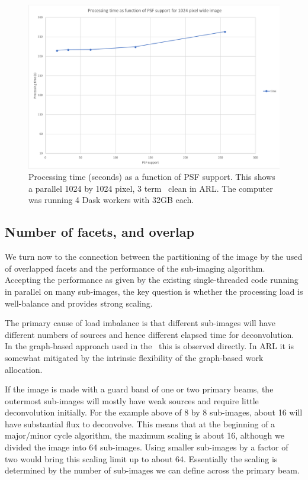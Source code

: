 \documentclass[11pt,a4paper,variablewidth]{article}
\begin{document}
\begin{figure}[h]
  \centering
  \includegraphics[width=\textwidth]{./pngs/time_versus_support}
  \caption{Processing time (seconds) as a function of PSF support. This shows  a parallel 1024 by 1024 pixel, 3 term \MAM\ clean in ARL. The computer was running 4 Dask workers with 32GB each.}
  \label{fig:time_vs_support}
\end{figure}

\subsection{Number of facets, and overlap}

We turn now to the connection between the partitioning of the image by the used of overlapped facets and the performance of the sub-imaging algorithm. Accepting the performance as given by the existing single-threaded code running in parallel on many sub-images, the key question is whether the processing load is well-balance and provides strong scaling.

The primary cause of load imbalance is that different sub-images will have different numbers of sources and hence different elapsed time for deconvolution. In the graph-based approach used in the \ARL\ this is observed directly. In ARL it is somewhat mitigated by the intrinsic flexibility of the graph-based work allocation. 

If the image is made with a guard band of one or two primary beams, the outermost sub-images will mostly have weak sources and require little deconvolution initially. For the example above of 8 by 8 sub-images, about 16 will have substantial flux to deconvolve. This means that at the beginning of a major/minor cycle algorithm, the maximum scaling is about 16, although we divided the image into 64 sub-images. Using smaller sub-images by a factor of two would bring this scaling limit up to about 64. Essentially the scaling is determined by the number of sub-images we can define across the primary beam.
\end{document}
